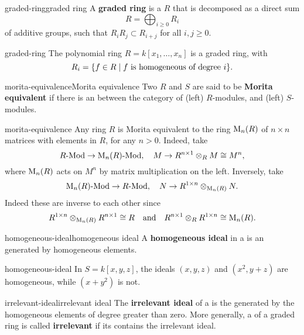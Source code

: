 \begin{topic}{graded-ring}{graded ring}
    A \textbf{graded ring} is a  $R$ that is decomposed as a direct sum
    \[ R = \bigoplus_{i \ge 0} R_i \]
    of additive groups, such that $R_i R_j \subset R_{i + j}$ for all $i, j \ge 0$.
\end{topic}

\begin{example}{graded-ring}
    The polynomial ring $R = k[x_1, \ldots, x_n]$ is a graded ring, with
    \[ R_i = \{ f \in R \mid f \textup{ is homogeneous of degree $i$} \} . \]
\end{example}

\begin{topic}{morita-equivalence}{Morita equivalence}
    Two  $R$ and $S$ are said to be \textbf{Morita equivalent} if there is an  between the category of (left) $R$-modules, and (left) $S$-modules.
\end{topic}

\begin{example}{morita-equivalence}
    Any ring $R$ is Morita equivalent to the ring $\textup{M}_n(R)$ of $n \times n$ matrices with elements in $R$, for any $n > 0$. Indeed, take
    \[ R\textup{-Mod} \to \textup{M}_n(R)\textup{-Mod}, \quad M \to R^{n \times 1} \otimes_R M \cong M^n , \]
    where $\textup{M}_n(R)$ acts on $M^n$ by matrix multiplication on the left. Inversely, take
    \[ \textup{M}_n(R)\textup{-Mod} \to R\textup{-Mod}, \quad N \to R^{1 \times n} \otimes_{\textup{M}_n(R)} N . \]
    Indeed these are inverse to each other since
    \[ R^{1 \times n} \otimes_{\textup{M}_n(R)} R^{n \times 1} \cong R \quad \textup{and} \quad R^{n \times 1} \otimes_R R^{1 \times n} \cong \textup{M}_n(R) . \]
\end{example}

\begin{topic}{homogeneous-ideal}{homogeneous ideal}
    A \textbf{homogeneous ideal} in a  is an  generated by homogeneous elements.
\end{topic}

\begin{example}{homogeneous-ideal}
    In $S = k[x, y, z]$, the ideals $(x, y, z)$ and $(x^2, y + z)$ are homogeneous, while $(x + y^2)$ is not.
\end{example}

\begin{topic}{irrelevant-ideal}{irrelevant ideal}
    The \textbf{irrelevant ideal} of a  is the  generated by the homogeneous elements of degree greater than zero. More generally, a  of a graded ring is called \textbf{irrelevant} if its  contains the irrelevant ideal.
\end{topic}

